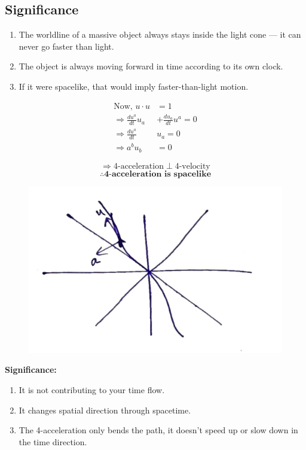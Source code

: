 \documentclass[14pt]{article} %
\begin{document}
\subsection*{Significance}
\begin{enumerate}
    \item The worldline of a massive object always stays inside the light cone --- it can never go faster than light.
    \item The object is always moving forward in time according to its own clock.
    \item If it were spacelike, that would imply faster-than-light motion.
\end{enumerate}
\begin{align*}
    \text{Now, }u \cdot u &= 1 \\
    \Rightarrow \frac{du^a}{dt} u_a &+ \frac{du_a}{dt} u^a = 0 \\
    \Rightarrow \frac{du^a}{dt} &u_a = 0 \\
    \Rightarrow a^b u_b &= 0
\end{align*}
\begin{figure}[H]
\centering
\begin{minipage}[c]{0.45\textwidth}
\[
\Rightarrow \text{4-acceleration} \perp \text{4-velocity}
\]
\[
\therefore \textbf{4-acceleration is spacelike}
\]
\end{minipage}
\hfill
\begin{minipage}[c]{0.5\textwidth}
\centering
\includegraphics[width=\linewidth]{L(-1)_6.jpg}
\end{minipage}
\end{figure}
\newpage
\textbf{Significance:}
\begin{enumerate}
    \item It is not contributing to your time flow.
    \item It changes spatial direction through spacetime.
    \item The 4-acceleration only bends the path, it doesn't speed up or slow down in the time direction.
\end{enumerate}
\end{document}

